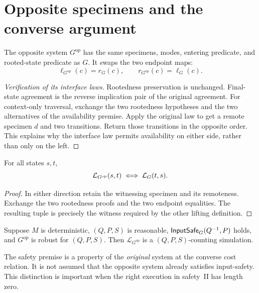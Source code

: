 \section{Opposite specimens and the converse argument}

\begin{definition}\label{term:opposite}
The opposite system $G^{\mathrm{op}}$ has the same specimens, modes,
entering predicate, and rooted-state predicate as $G$. It swaps the two
endpoint maps:
\[
 \ell_{G^{\mathrm{op}}}(c)=r_G(c),\qquad
 r_{G^{\mathrm{op}}}(c)=\ell_G(c).
\]
\end{definition}
\begin{proof}[Verification of its interface laws]
Rootedness preservation is unchanged. Final-state agreement is the
reverse implication pair of the original agreement. For context-only
traversal, exchange the two rootedness hypotheses and the two alternatives
of the availability premise. Apply the original law to get a remote
specimen $d$ and two transitions. Return those transitions in the
opposite order. This explains why the interface law permits availability
on either side, rather than only on the left.
\end{proof}

\begin{lemma}
For all states $s,t$,
\[
 \mathcal L_{G^{\mathrm{op}}}(s,t)\iff\mathcal L_G(t,s).
\]
\end{lemma}
\begin{proof}
In either direction retain the witnessing specimen and its remoteness.
Exchange the two rootedness proofs and the two endpoint equalities.
The resulting tuple is precisely the witness required by the other
lifting definition.
\end{proof}

\begin{theorem}
Suppose $M$ is deterministic, $(Q,P,S)$ is reasonable,
$\mathsf{InputSafe}_G(Q^{-1},P)$ holds, and $G^{\mathrm{op}}$ is robust for
$(Q,P,S)$. Then $\mathcal L_{G^{\mathrm{op}}}$ is a
$(Q,P,S)$-counting simulation.
\end{theorem}
The safety premise is a property of the \emph{original} system at the
converse cost relation. It is not assumed that the opposite system
already satisfies input-safety. This distinction is important when the
right execution in safety~II has length zero.

